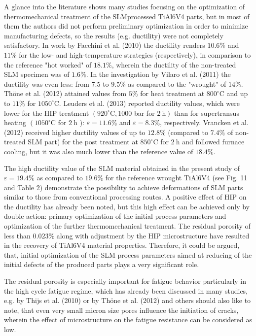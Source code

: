 \documentclass[10pt]{article}
\begin{document}
A glance into the literature shows many studies focusing on the optimization of thermomechanical treatment of the SLMprocessed TiAl6V4 parts, but in most of them the authors did not perform preliminary optimization in order to minimize manufacturing defects, so the results (e.g. ductility) were not completely satisfactory. In work by Facchini et al. (2010) the ductility renders $10.6 \%$ and $11 \%$ for the low- and high-temperature strategies (respectively), in comparison to the reference "hot worked" of $18.1 \%$, wherein the ductility of the non-treated SLM specimen was of $1.6 \%$. In the investigation by Vilaro et al. (2011) the ductility was even less: from 7.5 to $9.5 \%$ as compared to the "wrought" of $14 \%$. Thöne et al. (2012) attained values from $5 \%$ for heat treatment at $800^{\circ} \mathrm{C}$ and up to $11 \%$ for $1050^{\circ} \mathrm{C}$. Leuders et al. (2013) reported ductility values, which were lower for the HIP treatment $\left(920^{\circ} \mathrm{C}, 1000\right.$ bar for $\left.2 \mathrm{~h}\right)$ than for supertransus heating $\left(1050^{\circ} \mathrm{C}\right.$ for $2 \mathrm{~h}$ ): $\varepsilon=11.6 \%$ and $\varepsilon=8.3 \%$, respectively. Vrancken et al. (2012) received higher ductility values of up to $12.8 \%$ (compared to $7.4 \%$ of non-treated SLM part) for the post treatment at $850^{\circ} \mathrm{C}$ for $2 \mathrm{~h}$ and followed furnace cooling, but it was also much lower than the reference value of $18.4 \%$.

The high ductility value of the SLM material obtained in the present study of $\varepsilon=19.4 \%$ as compared to $19.6 \%$ for the reference wrought TiAl6V4 (see Fig. 11 and Table 2) demonstrate the possibility to achieve deformations of SLM parts similar to those from conventional processing routes. A positive effect of HIP on the ductility has already been noted, but this high effect can be achieved only by double action: primary optimization of the initial process parameters and optimization of the further thermomechanical treatment. The residual porosity of less than $0.023 \%$ along with adjustment by the HIP microstructure have resulted in the recovery of TiAl6V4 material properties. Therefore, it could be argued, that, initial optimization of the SLM process parameters aimed at reducing of the initial defects of the produced parts plays a very significant role.

The residual porosity is especially important for fatigue behavior particularly in the high cycle fatigue regime, which has already been discussed in many studies, e.g. by Thijs et al. (2010) or by Thöne et al. (2012) and others should also like to note, that even very small micron size pores influence the initiation of cracks, wherein the effect of microstructure on the fatigue resistance can be considered as low.
\end{document}

